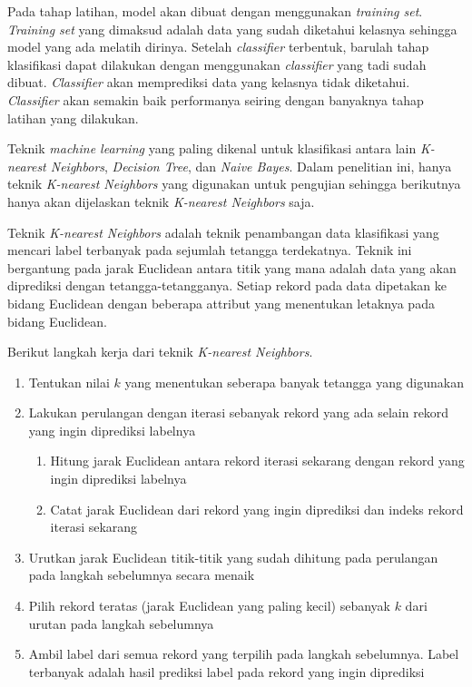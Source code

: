 \documentclass[a4paper,twoside]{article}
\begin{document}
\begin{enumerate}
\begin{enumerate}
			Pada tahap latihan, model akan dibuat dengan menggunakan \textit{training set}. \textit{Training set} yang dimaksud adalah data yang sudah diketahui kelasnya sehingga model yang ada melatih dirinya. Setelah \textit{classifier} terbentuk, barulah tahap klasifikasi dapat dilakukan dengan menggunakan \textit{classifier} yang tadi sudah dibuat. \textit{Classifier} akan memprediksi data yang kelasnya tidak diketahui. \textit{Classifier} akan semakin baik performanya seiring dengan banyaknya tahap latihan yang dilakukan.

			Teknik \textit{machine learning} yang paling dikenal untuk klasifikasi antara lain \textit{K-nearest Neighbors}, \textit{Decision Tree}, dan \textit{Naive Bayes}. Dalam penelitian ini, hanya teknik \textit{K-nearest Neighbors} yang digunakan untuk pengujian sehingga berikutnya hanya akan dijelaskan teknik \textit{K-nearest Neighbors} saja.

			Teknik \textit{K-nearest Neighbors} adalah teknik penambangan data klasifikasi yang mencari label terbanyak pada sejumlah tetangga terdekatnya. Teknik ini bergantung pada jarak Euclidean antara titik yang mana adalah data yang akan diprediksi dengan tetangga-tetangganya. Setiap rekord pada data dipetakan ke bidang Euclidean dengan beberapa attribut yang menentukan letaknya pada bidang Euclidean. 

			Berikut langkah kerja dari teknik \textit{K-nearest Neighbors}.
			\begin{enumerate}
				\item Tentukan nilai \(k\) yang menentukan seberapa banyak tetangga yang digunakan
				\item Lakukan perulangan dengan iterasi sebanyak rekord yang ada selain rekord yang ingin diprediksi labelnya
				\begin{enumerate}
					\item Hitung jarak Euclidean antara rekord iterasi sekarang dengan rekord yang ingin diprediksi labelnya
					\item Catat jarak Euclidean dari rekord yang ingin diprediksi dan indeks rekord iterasi sekarang
				\end{enumerate}
				\item Urutkan jarak Euclidean titik-titik yang sudah dihitung pada perulangan pada langkah sebelumnya secara menaik
				\item Pilih rekord teratas (jarak Euclidean yang paling kecil) sebanyak \(k\) dari urutan pada langkah sebelumnya
				\item Ambil label dari semua rekord yang terpilih pada langkah sebelumnya. Label terbanyak adalah hasil prediksi label pada rekord yang ingin diprediksi
			\end{enumerate}
			

\end{enumerate}
\end{enumerate}
\end{document}
